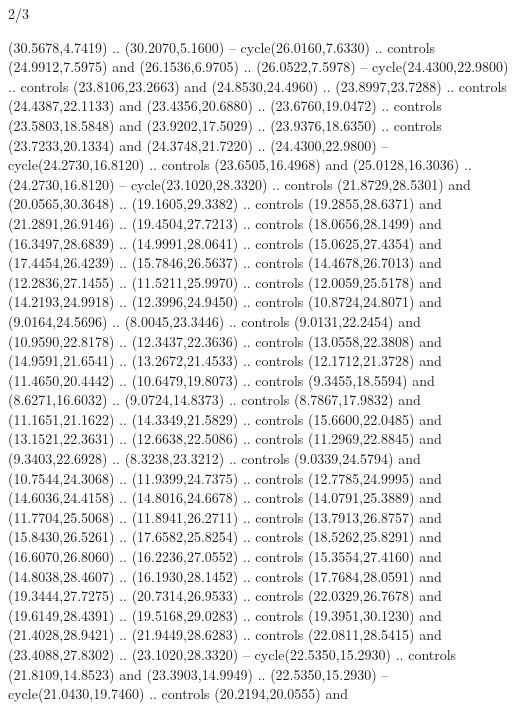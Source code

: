 \begin{flagdescription}{2/3}
\begin{scope}[yshift=\flagwidth,scale=\flagwidth/1241.93737]
\begin{scope}[y=-1mm, x=1mm,draw=gold,fill=blue,line join=miter,miter limit=4,line width=1.8\lw]
\begin{scope}[y=1mm, x=1mm, yscale=-1,shift={(573.68mm+\str,145.75)}]
\begin{scope}[scale=1.35,shift={(-9,-3)}]
\begin{scope}[scale=0.55]
\begin{scope}[scale=1.333]
    (30.5678,4.7419) .. (30.2070,5.1600) -- cycle(26.0160,7.6330) .. controls
    (24.9912,7.5975) and (26.1536,6.9705) .. (26.0522,7.5978) --
    cycle(24.4300,22.9800) .. controls (23.8106,23.2663) and (24.8530,24.4960) ..
    (23.8997,23.7288) .. controls (24.4387,22.1133) and (23.4356,20.6880) ..
    (23.6760,19.0472) .. controls (23.5803,18.5848) and (23.9202,17.5029) ..
    (23.9376,18.6350) .. controls (23.7233,20.1334) and (24.3748,21.7220) ..
    (24.4300,22.9800) -- cycle(24.2730,16.8120) .. controls (23.6505,16.4968) and
    (25.0128,16.3036) .. (24.2730,16.8120) -- cycle(23.1020,28.3320) .. controls
    (21.8729,28.5301) and (20.0565,30.3648) .. (19.1605,29.3382) .. controls
    (19.2855,28.6371) and (21.2891,26.9146) .. (19.4504,27.7213) .. controls
    (18.0656,28.1499) and (16.3497,28.6839) .. (14.9991,28.0641) .. controls
    (15.0625,27.4354) and (17.4454,26.4239) .. (15.7846,26.5637) .. controls
    (14.4678,26.7013) and (12.2836,27.1455) .. (11.5211,25.9970) .. controls
    (12.0059,25.5178) and (14.2193,24.9918) .. (12.3996,24.9450) .. controls
    (10.8724,24.8071) and (9.0164,24.5696) .. (8.0045,23.3446) .. controls
    (9.0131,22.2454) and (10.9590,22.8178) .. (12.3437,22.3636) .. controls
    (13.0558,22.3808) and (14.9591,21.6541) .. (13.2672,21.4533) .. controls
    (12.1712,21.3728) and (11.4650,20.4442) .. (10.6479,19.8073) .. controls
    (9.3455,18.5594) and (8.6271,16.6032) .. (9.0724,14.8373) .. controls
    (8.7867,17.9832) and (11.1651,21.1622) .. (14.3349,21.5829) .. controls
    (15.6600,22.0485) and (13.1521,22.3631) .. (12.6638,22.5086) .. controls
    (11.2969,22.8845) and (9.3403,22.6928) .. (8.3238,23.3212) .. controls
    (9.0339,24.5794) and (10.7544,24.3068) .. (11.9399,24.7375) .. controls
    (12.7785,24.9995) and (14.6036,24.4158) .. (14.8016,24.6678) .. controls
    (14.0791,25.3889) and (11.7704,25.5068) .. (11.8941,26.2711) .. controls
    (13.7913,26.8757) and (15.8430,26.5261) .. (17.6582,25.8254) .. controls
    (18.5262,25.8291) and (16.6070,26.8060) .. (16.2236,27.0552) .. controls
    (15.3554,27.4160) and (14.8038,28.4607) .. (16.1930,28.1452) .. controls
    (17.7684,28.0591) and (19.3444,27.7275) .. (20.7314,26.9533) .. controls
    (22.0329,26.7678) and (19.6149,28.4391) .. (19.5168,29.0283) .. controls
    (19.3951,30.1230) and (21.4028,28.9421) .. (21.9449,28.6283) .. controls
    (22.0811,28.5415) and (23.4088,27.8302) .. (23.1020,28.3320) --
    cycle(22.5350,15.2930) .. controls (21.8109,14.8523) and (23.3903,14.9949) ..
    (22.5350,15.2930) -- cycle(21.0430,19.7460) .. controls (20.2194,20.0555) and

\end{scope}
\end{scope}
\end{scope}
\end{scope}
\end{scope}
\end{scope}
\end{flagdescription}
